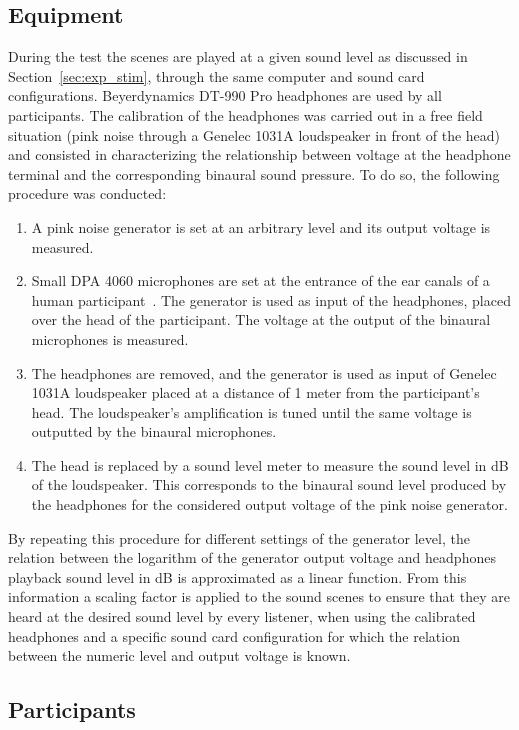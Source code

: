 \documentclass[twocolumn]{article}
\begin{document}
\subsection{Equipment}
\label{sec:exp_equi}

During the test the scenes are played at a given sound level as discussed in Section~\ref{sec:exp_stim}, through the same computer and sound card configurations. Beyerdynamics DT-990 Pro headphones are used by all participants. The calibration of the headphones was carried out in a free field situation (pink noise through a Genelec 1031A loudspeaker in front of the head) and consisted in characterizing the relationship between voltage at the headphone terminal and the corresponding binaural sound pressure. To do so, the following procedure was conducted:
\begin{enumerate}
\item A pink noise generator is set at an arbitrary level and its output voltage is measured.
\item Small DPA 4060 microphones are set at the entrance of the ear canals of a human participant~\cite{moller1992}. The generator is used as input of the headphones, placed over the head of the participant. The voltage at the output of the binaural microphones is measured.
\item The headphones are removed, and the generator is used as input of Genelec 1031A loudspeaker placed at a distance of 1 meter from the participant's head. The loudspeaker's amplification is tuned until the same voltage is outputted by the binaural microphones.
\item The head is replaced by a sound level meter to measure the sound level in dB of the loudspeaker. This corresponds to the binaural sound level produced by the headphones for the considered output voltage of the pink noise generator.
\end{enumerate}
By repeating this procedure for different settings of the generator level, the relation between the logarithm of the generator output voltage and headphones playback sound level in dB is approximated as a linear function. From this information a scaling factor is applied to the sound scenes to ensure that they are heard at the desired sound level by every listener, when using the calibrated headphones and a specific sound card configuration for which the relation between the numeric level and output voltage is known.

\subsection{Participants}
\label{sec:exp_part}
\end{document}
